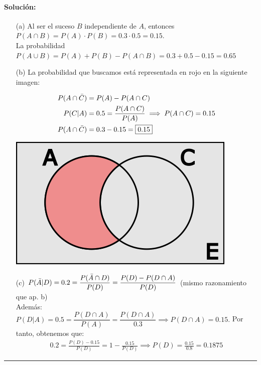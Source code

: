 \paragraph{Solución:}
\begin{enumerate}
    \item[(a)] Al ser el suceso $B$ independiente de $A$, entonces $P(A\cap B)=P(A)\cdot P(B)=0.3 \cdot 0.5=0.15$. \\ La probabilidad $P(A\cup B)=P(A)+P(B)-P(A\cap B)=0.3+0.5-0.15=\boxed{0.65}$ 
    \item[(b)] La probabilidad que buscamos está representada en rojo en la siguiente imagen:
    
    \begin{minipage}{.64\textwidth}
    \begin{equation*}
        \begin{split}
            P(A\cap \Bar{C})&=P(A)-P(A\cap C) \\
            P(C|A)&=0.5=\frac{P(A\cap C)}{P(A)}\implies P(A\cap C)=0.15\\
            P(A\cap \Bar{C})&=0.3-0.15=\boxed{0.15}
        \end{split}
    \end{equation*}
    \end{minipage}
    \begin{minipage}{.64\textwidth}
        \setlength{\parindent}{1em}
        \includegraphics[scale=.4]{g6449.png}
    \end{minipage}

    \item[(c)] $P(\Bar{A}|D)=0.2=\dfrac{P(\Bar{A}\cap D)}{P(D)}=\dfrac{P(D)-P(D\cap A)}{P(D)}$ \small (mismo razonamiento que ap. b) \normalsize\\
    Además:\\
    $
    P(D|A)=0.5=\dfrac{P(D\cap A)}{P(A)}=\dfrac{P(D\cap A)}{0.3}\implies P(D\cap A)=0.15.
    $ Por tanto, obtenemos que:
    \begin{gather*}
        0.2=\frac{P(D)-0.15}{P(D)}=1-\frac{0.15}{P(D)}\implies \boxed{P(D)=\frac{0.15}{0.8}=0.1875}
    \end{gather*}
\end{enumerate}
\noindent\rule{\textwidth}{0.5pt}